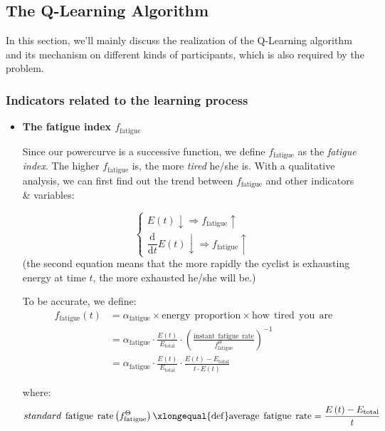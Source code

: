 \documentclass[14pt]{article}
\theoremstyle{definition}
\theoremstyle{remark}
\numberwithin{equation}{section}
\begin{document}
	\subsection{The Q-Learning Algorithm}
	In this section, we'll mainly discuss the realization of the Q-Learning algorithm and its mechanism on different kinds of participants, which is also required by the problem.
	\subsubsection{Indicators related to the learning process}
		\begin{itemize}
			\item \textbf{The fatigue index \(f_{\mathrm{fatigue}}\)}

				Since our powercurve is a successive function, we define \(f_{\mathrm{fatigue}}\) as the \textit{fatigue index}. The higher \(f_{\mathrm{fatigue}}\) is, the more \textit{tired} he/she is. With a qualitative analysis, we can first find out the trend between \(f_{\mathrm{fatigue}}\) and other indicators \& variables:

				\[
					\begin{cases}
						E(t)\downarrow\Rightarrow f_{\mathrm{fatigue}}\uparrow \\
						\dfrac{\mathrm{d}}{\mathrm{d}t}E(t)\downarrow\Rightarrow f_{\mathrm{fatigue}}\uparrow
					\end{cases}
				\]
				(the second equation means that the more rapidly the cyclist is exhausting energy at time \(t\), the more exhausted he/she will be.)

				To be accurate, we define:
				\[
					\begin{aligned}
						f_{\mathrm{fatigue}}\left( t \right) &=\alpha _{\mathrm{fatigue}}\times \mathrm{energy}\:\:\mathrm{proportion}\times \mathrm{how}\:\:\mathrm{tired}\:\:\mathrm{you}\:\:\mathrm{are}
						\\
						&=\alpha _{\mathrm{fatigue}}\cdot \frac{E\left( t \right)}{E_{\mathrm{total}}}\cdot \left( \frac{\mathrm{instant}\:\:\mathrm{fatigue}\:\:\mathrm{rate}}{f_{\mathrm{fatigue}}^{\Theta}} \right) ^{-1}
						\\
						&=\alpha _{\mathrm{fatigue}}\cdot \frac{E\left( t \right)}{E_{\mathrm{total}}}\cdot \frac{E\left( t \right) -E_{\mathrm{total}}}{t\cdot \dot{E}\left( t \right)}
					\end{aligned}
						\]

				where:
				\[
					standard\:\:\mathrm{fatigue}\:\:\mathrm{rate}\left( f_{\mathrm{fatigue}}^{\Theta} \right) \xlongequal{\mathrm{def}}\mathrm{average}\:\:\mathrm{fatigue}\:\:\mathrm{rate}=\dfrac{E\left( t \right) -E_{\mathrm{total}}}{t}
				\]


\end{itemize}
\end{document}

